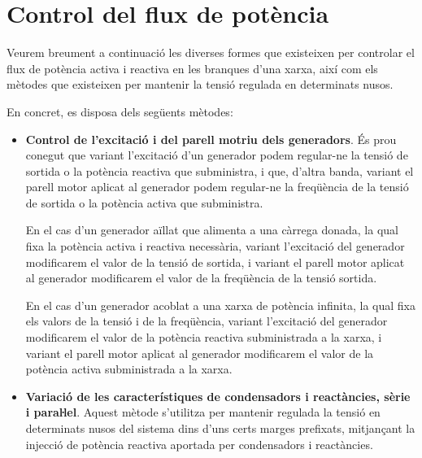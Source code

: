 \section{Control del flux de potència} \label{sec:control-flux-pot}

Veurem breument a continuació les diverses formes que existeixen
per controlar el flux de potència activa i reactiva en les branques
d'una xarxa, així com els mètodes que existeixen per mantenir la
tensió regulada en determinats nusos.

En concret, es disposa dels següents mètodes:

\begin{itemize}
 \item \textbf{Control de l'excitació i del parell motriu dels generadors}. És prou conegut
    que variant l'excitació d'un generador podem regular-ne la tensió de sortida o
        la potència reactiva que subministra, i que, d'altra banda, variant el parell motor aplicat al generador
    podem regular-ne la freqüència de la  tensió de sortida o la potència activa que subministra.

    En el cas d'un generador aïllat que alimenta a una càrrega
    donada, la qual fixa la potència activa i reactiva necessària, variant
     l'excitació del generador modificarem el valor de la tensió de sortida, i variant el parell motor aplicat al generador modificarem el valor de la freqüència de la tensió sortida.

     En el cas d'un generador acoblat a una xarxa de potència
    infinita, la qual fixa els valors de la tensió i de la freqüència, variant l'excitació del generador modificarem el valor de la potència reactiva subministrada a la xarxa, i variant el parell motor aplicat al     generador modificarem el valor de la potència
    activa  subministrada a la xarxa.

   \item \textbf{Variació de les característiques de condensadors i reactàncies, sèrie
    i paraŀlel}. Aquest mètode s'utilitza per mantenir regulada la tensió en determinats
     nusos del sistema dins d'uns certs marges prefixats, mitjançant la injecció  de potència
      reactiva aportada per condensadors i reactàncies.


\end{itemize}
